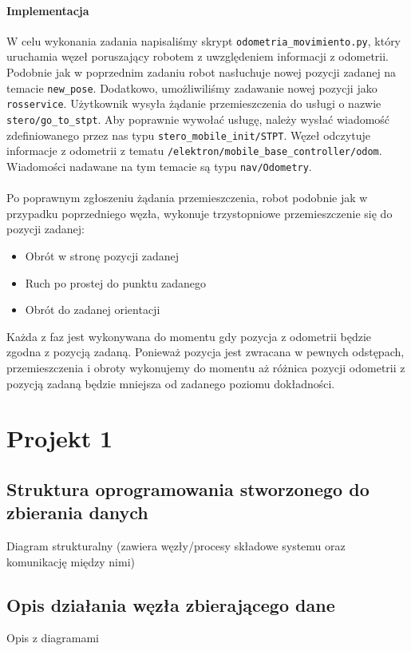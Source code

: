 \documentclass{mwrep}
\begin{document}
\subsubsection{Implementacja}
W celu wykonania zadania napisaliśmy skrypt \texttt{odometria\_{}movimiento.py}, który uruchamia węzeł
poruszający robotem z uwzględeniem informacji z odometrii. Podobnie jak w poprzednim zadaniu robot nasłuchuje
nowej pozycji zadanej na temacie \texttt{new\_{}pose}. Dodatkowo, umożliwiliśmy zadawanie nowej pozycji jako 
\texttt{rosservice}. Użytkownik wysyła żądanie przemieszczenia do usługi o nazwie \texttt{stero/go\_{}to\_{}stpt}.
Aby poprawnie wywołać usługę, należy wysłać wiadomość zdefiniowanego przez nas typu \texttt{stero\_{}mobile\_{}init/STPT}.
Węzeł odczytuje informacje z odometrii 
z tematu \texttt{/elektron/mobile\_{}base\_{}controller/odom}. Wiadomości nadawane na tym temacie są typu \texttt{nav/Odometry}.\\
\\
\indent{} Po poprawnym zgłoszeniu żądania przemieszczenia, robot podobnie jak w przypadku poprzedniego węzła, 
wykonuje trzystopniowe przemieszczenie się do pozycji zadanej:\\
\begin{itemize}
	\item Obrót w stronę pozycji zadanej
	\item Ruch po prostej do punktu zadanego
	\item Obrót do zadanej orientacji\\
\end{itemize}

Każda z faz jest wykonywana do momentu gdy pozycja z odometrii będzie zgodna z pozycją zadaną. Ponieważ pozycja jest 
zwracana w pewnych odstępach, przemieszczenia i obroty wykonujemy do momentu aż różnica pozycji odometrii z pozycją
zadaną będzie mniejsza od zadanego poziomu dokładności.



\chapter{Projekt 1}

\section{Struktura oprogramowania stworzonego do zbierania danych}
Diagram strukturalny (zawiera węzły/procesy składowe systemu oraz komunikację między
nimi)
\section{Opis działania węzła zbierającego dane}
Opis z diagramami
\end{document}
